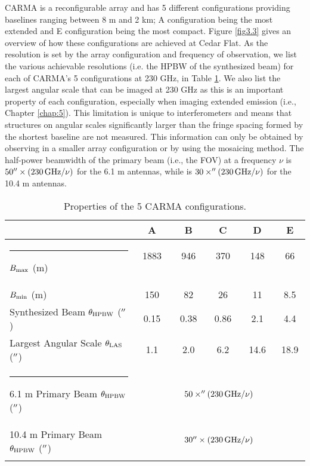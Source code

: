 CARMA is a reconfigurable array and has 5 different configurations providing baselines ranging between 8 m and 2 km; A configuration being the most extended and E configuration being the most compact. Figure \ref{fig3.3} gives an overview of how these configurations are achieved at Cedar Flat. As the resolution is set by the array configuration and frequency of observation, we list the various achievable resolutions (i.e. the HPBW of the synthesized beam) for each of CARMA's 5 configurations at 230 GHz, in Table \ref{tab:3.2}.  We also list the largest angular scale that can be imaged at 230 GHz as this is an important property of each configuration, especially when imaging extended emission (i.e., Chapter \ref{chap:5}). This limitation is unique to interferometers and means that structures on angular scales significantly larger than the fringe spacing formed by the shortest baseline are not measured. This information can only be obtained by observing in a smaller array configuration or by using the mosaicing method. The half-power beamwidth of the primary beam (i.e., the FOV) at a frequency $\nu$ is $50^{\prime\prime} \times (230\,\rm{GHz}/\nu)$ for the 6.1 m antennas, while is $30\times  ^{\prime\prime}(230\,\rm{GHz}/\nu)$ for the 10.4 m antennas.

\begin{table}[!hbt]
\begin{center}
\caption[Properties of the 5 CARMA array configurations.]
{Properties of the 5 CARMA configurations.}
\begin{tabular}{lccccc}
\hline
\hline
\rule{0pt}{2.5ex} & A & B & C & D & E \\
\hline
\rule{-4.0pt}{2.5ex} $B_{\rm{max}}$ (m) &1883 \ \ & 946 \ \ & 370 \ \ & 148 \ \ & 66 \ \ \\
$B_{\rm{min}}$ (m)& 150& 82& 26& 11& 8.5\\ 
Synthesized Beam $\theta _{\rm{HPBW}}$ ($^{\prime\prime}$)& 0.15& 0.38& 0.86& 2.1& 4.4\\ 
Largest Angular Scale $\theta _{\rm{LAS}}$ ($^{\prime\prime}$) & 1.1& 2.0& 6.2& 14.6& 18.9\\ 
\hline
\rule{-4.0pt}{2.5ex} 6.1 m Primary Beam $\theta _{\rm{HPBW}}$ ($^{\prime\prime}$) & \multicolumn{5}{c}{$50\times ^{\prime\prime}(230\,\rm{GHz}/\nu)$} \\ 
10.4 m Primary Beam $\theta _{\rm{HPBW}}$ ($^{\prime\prime}$) & \multicolumn{5}{c}{$30^{\prime\prime} \times (230\,\rm{GHz}/\nu)$} \\ 
\hline
\rule{0pt}{2.0ex}
\end{tabular}
\label{tab:3.2}
\end{center}
\end{table}
\vspace*{-5mm}

